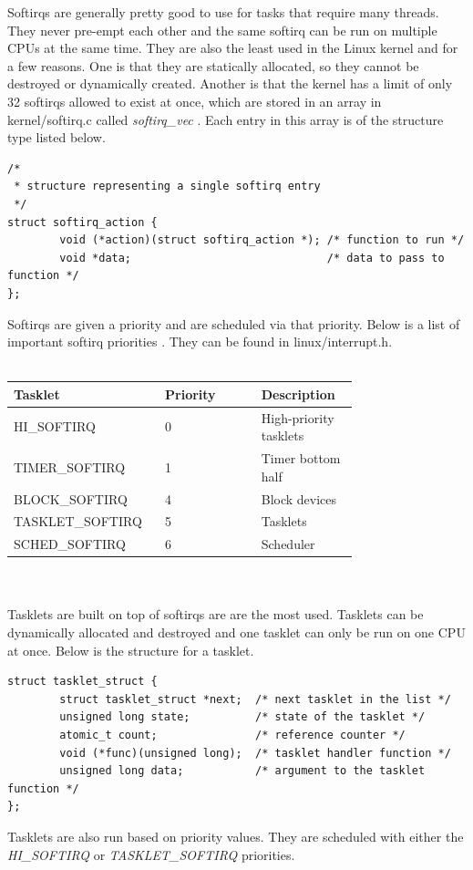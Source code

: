 \documentclass[10pt,draftclsnofoot,onecolumn,journal,compsoc]{IEEEtran}
\begin{document}
Softirqs are generally pretty good to use for tasks that require many threads. They never pre-empt each other and the same softirq can be run on multiple CPUs at the same time. They are also the least used in the Linux kernel and for a few reasons. One is that they are statically allocated, so they cannot be destroyed or dynamically created. Another is that the kernel has a limit of only 32 softirqs allowed to exist at once, which are stored in an array in kernel/softirq.c called \textit{softirq\_vec} \cite{linux_proc}. Each entry in this array is of the structure type listed below.
\begin{lstlisting}[caption={The \textit{softirq\_action} structure in the linux/interrupt.h file.}]
/*
 * structure representing a single softirq entry
 */
struct softirq_action {
        void (*action)(struct softirq_action *); /* function to run */
        void *data;                              /* data to pass to function */
};
\end{lstlisting}
Softirqs are given a priority and are scheduled via that priority. Below is a list of important softirq priorities \cite{linux_proc}. They can be found in linux/interrupt.h. \\ \\
\begin{tabular}{ | p{0.25\linewidth} | p{0.25\linewidth} | p{0.25\linewidth} | }
    \hline
Tasklet & Priority & Description \\ \hline
HI\_SOFTIRQ & 0 & High-priority tasklets \\ \hline
TIMER\_SOFTIRQ & 1 & Timer bottom half \\ \hline
BLOCK\_SOFTIRQ & 4 & Block devices \\ \hline
TASKLET\_SOFTIRQ & 5 & Tasklets \\ \hline
SCHED\_SOFTIRQ & 6 & Scheduler \\ \hline
\end{tabular} \\ \\ 
Tasklets are built on top of softirqs are are the most used. Tasklets can be dynamically allocated and destroyed and one tasklet can only be run on one CPU at once. Below is the structure for a tasklet.

\begin{lstlisting}[caption={The \textit{tasklet\_struct} structure in the linux/interrupt.h file.}]
struct tasklet_struct {
        struct tasklet_struct *next;  /* next tasklet in the list */
        unsigned long state;          /* state of the tasklet */
        atomic_t count;               /* reference counter */
        void (*func)(unsigned long);  /* tasklet handler function */
        unsigned long data;           /* argument to the tasklet function */
};
\end{lstlisting}
Tasklets are also run based on priority values. They are scheduled with either the \textit{HI\_SOFTIRQ} or \textit{TASKLET\_SOFTIRQ} priorities. 
\end{document}
